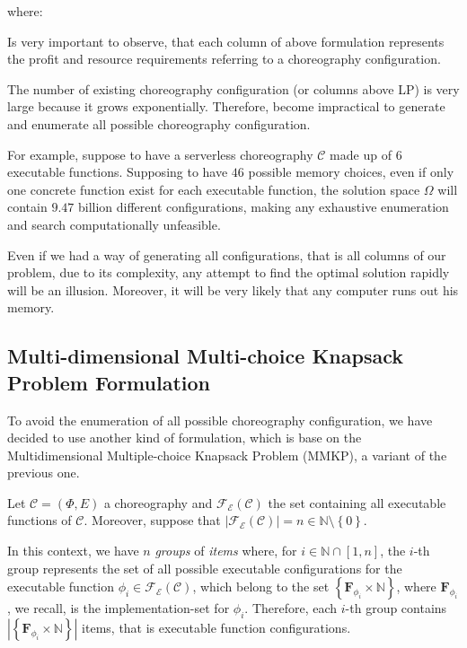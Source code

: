 \documentclass[12pt,a4paper]{report}
\newcommand{\N}{\mathbb{N}}
\begin{document}
where:

Is very important to observe, that each column of above formulation represents the profit and resource requirements referring to a choreography configuration.

The number of existing choreography configuration (or columns above LP) is very large because it grows exponentially. Therefore, become impractical to generate and enumerate all possible choreography configuration.

For example, suppose to have a serverless choreography $\mathcal{C}$ made up of $6$ executable functions. Supposing to have $46$ possible memory choices, even if only one concrete function exist for each executable function, the solution space $\Omega$ will contain $9.47$ billion different configurations, making any exhaustive enumeration and search computationally unfeasible. 

Even if we had a way of generating all configurations, that is all columns of our problem, due to its complexity, any attempt to find the optimal solution rapidly will be an illusion. Moreover, it will be very likely that any computer runs out his memory.

\subsection{Multi-dimensional Multi-choice Knapsack Problem Formulation}

To avoid the enumeration of all possible choreography configuration, we have decided to use another kind of formulation, which is base on the Multidimensional Multiple-choice Knapsack Problem (MMKP), a variant of the previous one. 

Let $\mathcal{C} = (\Phi,E)$ a choreography and $\mathscr{F_E}(\mathcal{C})$ the set containing all executable functions of $\mathcal{C}$. Moreover, suppose that $|\mathscr{F_E}(\mathcal{C})| = n \in \N \setminus \left\{0\right\}$.

In this context, we have $n$ \textit{groups} of \textit{items} where, for $i \in \N \cap \left[1,n\right]$, the $i$-th group represents the set of all possible executable configurations for the executable function $\phi_i \in \mathscr{F_E}(\mathcal{C})$, which belong to the set $\left\{ \textbf{F}_{\phi_{i}} \times \N \right\}$, where $\textbf{F}_{\phi_{i}}$, we recall, is the implementation-set for $\phi_i$. Therefore, each $i$-th group contains $|\left\{ \textbf{F}_{\phi_{i}} \times \N \right\}|$ items, that is executable function configurations.
\end{document}

